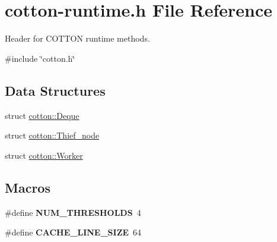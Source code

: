 \hypertarget{cotton-runtime_8h}{}\section{cotton-\/runtime.h File Reference}
\label{cotton-runtime_8h}


Header for C\+O\+T\+T\+ON runtime methods.  


{\ttfamily \#include \char`\"{}cotton.\+h\char`\"{}}\newline
\subsection*{Data Structures}
\begin{DoxyCompactItemize}
\item 
struct \mbox{\hyperlink{structcotton_1_1Deque}{cotton\+::\+Deque}}
\item 
struct \mbox{\hyperlink{structcotton_1_1Thief__node}{cotton\+::\+Thief\+\_\+node}}
\item 
struct \mbox{\hyperlink{structcotton_1_1Worker}{cotton\+::\+Worker}}
\end{DoxyCompactItemize}
\subsection*{Macros}
\begin{DoxyCompactItemize}
\item 
\mbox{\label{cotton-runtime_8h_a10290155a529ee095e61fe1c9e181293}} 
\#define {\bfseries N\+U\+M\+\_\+\+T\+H\+R\+E\+S\+H\+O\+L\+DS}~4
\item 
\mbox{\label{cotton-runtime_8h_af89f60b07247176687889ade776c8e10}} 
\#define {\bfseries C\+A\+C\+H\+E\+\_\+\+L\+I\+N\+E\+\_\+\+S\+I\+ZE}~64
\end{DoxyCompactItemize}
